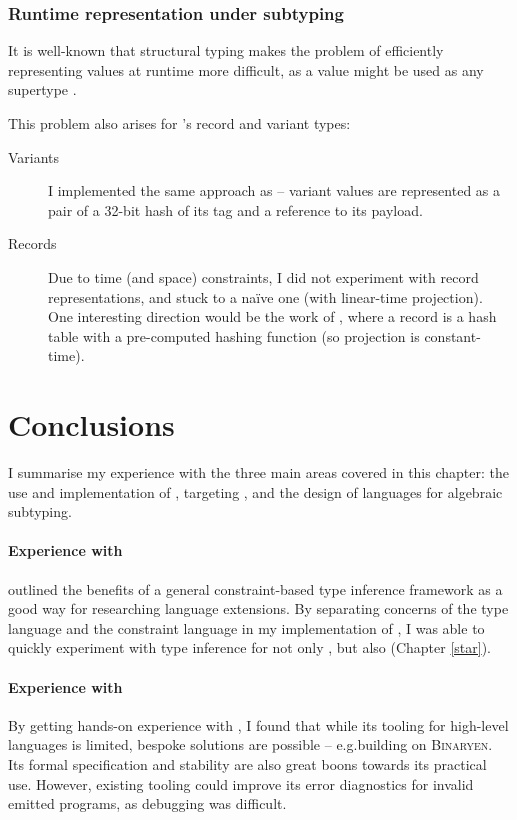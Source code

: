 \subsubsection{Runtime representation under subtyping}

It is well-known that structural typing makes the problem of efficiently representing values at runtime more difficult, as a value might be used as any supertype \cite{tapl}. 

This problem also arises for \fabric{}'s record and variant types: 
\begin{description}
    \item[Variants] I implemented the same approach as \textcite{polymorphic-variants} -- variant values are represented as a pair of a 32-bit hash of its tag and a reference to its payload.
    \item[Records] Due to time (and space) constraints, I did not experiment with record representations, and stuck to a na\"ive one (with linear-time projection). One interesting direction would be the work of \textcite{remy-extensible-records}, where a record is a hash table with a pre-computed hashing function (so projection is constant-time). 
\end{description}

\section{Conclusions}

I summarise my experience with the three main areas covered in this chapter: the use and implementation of \inference{}, targeting \wasm{}, and the design of languages for algebraic subtyping.

\paragraph{Experience with \inference{}}
\textcite{pottier-framework} outlined the benefits of a general constraint-based type inference framework as a good way for researching language extensions. 
By separating concerns of the type language and the constraint language in my implementation of \compiler{}, I was able to quickly experiment with type inference for not only \fabric{}, but also \starr{} (Chapter \ref{star}).

\paragraph{Experience with \wasm{}}
By getting hands-on experience with \wasm{}, I found that while its tooling for high-level languages is limited, bespoke solutions are possible -- e.g.\@ building on \textsc{Binaryen}. Its formal specification and stability are also great boons towards its practical use. However, existing tooling could improve its error diagnostics for invalid emitted programs, as debugging was difficult.

